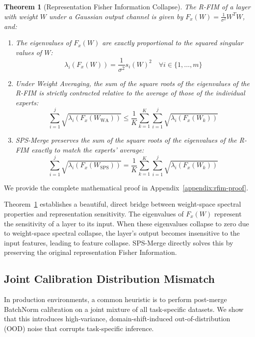 \documentclass{article}
\theoremstyle{plain}
\newtheorem{theorem}{Theorem}[section]
\theoremstyle{definition}
\theoremstyle{remark}
\begin{document}
\begin{theorem}[Representation Fisher Information Collapse]
\label{thm:rfim-collapse}
The R-FIM of a layer with weight $W$ under a Gaussian output channel is given by $F_x(W) = \frac{1}{\sigma^2} W^T W$, and:
\begin{enumerate}
    \item The eigenvalues of $F_x(W)$ are exactly proportional to the squared singular values of $W$:
    \begin{equation}
        \lambda_i(F_x(W)) = \frac{1}{\sigma^2} s_i(W)^2 \quad \forall i \in \{1, \dots, m\}
    \end{equation}
    \item Under Weight Averaging, the sum of the square roots of the eigenvalues of the R-FIM is strictly contracted relative to the average of those of the individual experts:
    \begin{equation}
        \sum_{i=1}^j \sqrt{\lambda_i(F_x(W_{\text{WA}}))} \le \frac{1}{K} \sum_{k=1}^K \sum_{i=1}^j \sqrt{\lambda_i(F_x(W_k))}
    \end{equation}
    \item SPS-Merge preserves the sum of the square roots of the eigenvalues of the R-FIM exactly to match the experts' average:
    \begin{equation}
        \sum_{i=1}^j \sqrt{\lambda_i(F_x(W_{\text{SPS}}))} = \frac{1}{K} \sum_{k=1}^K \sum_{i=1}^j \sqrt{\lambda_i(F_x(W_k))}
    \end{equation}
\end{enumerate}
\end{theorem}

We provide the complete mathematical proof in Appendix~\ref{appendix:rfim-proof}.

Theorem~\ref{thm:rfim-collapse} establishes a beautiful, direct bridge between weight-space spectral properties and representation sensitivity. The eigenvalues of $F_x(W)$ represent the sensitivity of a layer to its input. When these eigenvalues collapse to zero due to weight-space spectral collapse, the layer's output becomes insensitive to the input features, leading to feature collapse. SPS-Merge directly solves this by preserving the original representation Fisher Information.

\subsection{Joint Calibration Distribution Mismatch}
In production environments, a common heuristic is to perform post-merge BatchNorm calibration on a joint mixture of all task-specific datasets. We show that this introduces high-variance, domain-shift-induced out-of-distribution (OOD) noise that corrupts task-specific inference.
\end{document}
